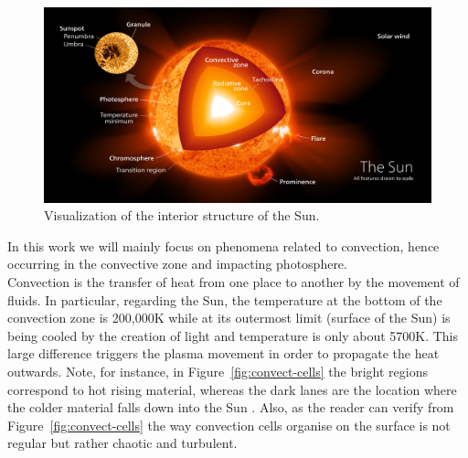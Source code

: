 \begin{figure}[t]
    \centering
    \includegraphics[width=\textwidth]{./pictures/interior.PNG}
    \caption{Visualization of the interior structure of the Sun. \cite{kelvin13}}
    \label{fig:structure}
\end{figure}
In this work we will mainly focus on phenomena related to convection, hence occurring in the convective zone and impacting photosphere.\\
Convection is the transfer of heat from one place to another by the movement of fluids. In particular, regarding the Sun, the temperature at the bottom of the convection zone is 200,000\degree K while at its outermost limit (surface of the Sun) is being cooled by the creation of light and temperature is only about 5700\degree K. This large difference triggers the plasma movement in order to propagate the heat outwards. Note, for instance, in Figure~\ref{fig:convect-cells} the bright regions correspond to hot rising material, whereas the dark lanes are the location where the colder material falls down into the Sun \cite{convect}. Also, as the reader can verify from Figure~\ref{fig:convect-cells} the way convection cells organise on the surface is not regular but rather chaotic and turbulent.
